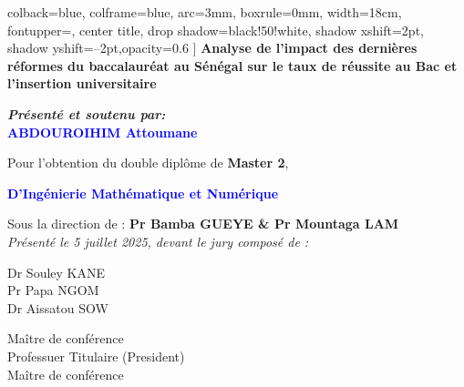 \documentclass[a4paper,12pt]{report}                %
\begin{document}
\begin{titlepage}
\begin{center}
\begin{tcolorbox}
            colback=blue,
            colframe=blue,
            arc=3mm,
            boxrule=0mm,
            width=18cm,
            fontupper=\color{white}, 
            center title, 
            drop shadow={black!50!white, shadow xshift=2pt, shadow yshift=--2pt,opacity=0.6}
            ]
            \centering
            \textbf{\LARGE Analyse de l'impact des dernières réformes du baccalauréat au Sénégal sur le taux de réussite au Bac et l’insertion universitaire}
        \end{tcolorbox}
        \vspace{1cm}
        \textbf{\textit{\large Présenté et soutenu par:}}\\[0.5cm]
        \textcolor{blue}{\textbf{\LARGE ABDOUROIHIM Attoumane}}
    \end{center}
    \vspace{1cm}
    \begin{flushleft}
        \hspace{0.1cm} 
        \textmd{\large Pour l'obtention du double diplôme de \textbf{\Large Master 2},}
        \begin{center}
            \textmd{\Large \textcolor{blue}{\textbf{D'Ingénierie Mathématique et Numérique}}}
        \end{center}
        \vspace{0.5cm}
        \hspace{0.1cm}
        \textmd{\large Sous la direction de : \textbf{\Large Pr Bamba GUEYE \& Pr Mountaga LAM}}\\  
        \vspace{1cm}
        \hspace{1cm}
        \textit{\large Présenté le 5 juillet 2025, devant le jury composé de :}\\
        \vspace{0.5cm}
        \begin{center}
        \hspace{3cm}
        \begin{minipage}{0.3\textwidth}
            \textmd{\Large Dr Souley KANE }\\[0.3cm]
            \textmd{\Large Pr Papa NGOM}\\[0.3cm]
            \textmd{\Large Dr Aissatou SOW}
        \end{minipage}
        \hfill
        \begin{minipage}{0.4\textwidth}
            \textmd{\large Maître de conférence}\\[0.3cm]
            \textmd{\large Professuer Titulaire (President)}\\[0.3cm]
            \textmd{\large Maître de conférence}
        \end{minipage}
    \end{center}
    \end{flushleft}
    
\end{titlepage}
\end{document}
